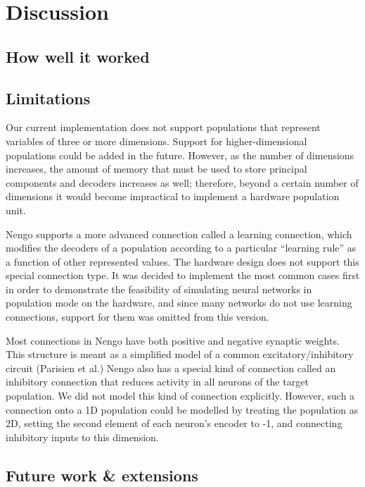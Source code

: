 \documentclass[english]{article}
\begin{document}
\section{Discussion}

\subsection{How well it worked}

\subsection{Limitations}

Our current implementation does not support populations that represent variables of three or more dimensions.
Support for higher-dimensional populations could be added in the future.
However, as the number of dimensions increases, the
amount of memory that must be used to store principal components and
decoders increases as well; therefore, beyond a certain number of
dimensions it would become impractical to implement a hardware
population unit.  

Nengo supports a more advanced connection called a learning connection,
which modifies the decoders of a population according to a particular ``learning rule''
as a function of other represented values. The hardware design does not support this special connection type.
It was decided to implement the most common cases first in order to demonstrate the feasibility of simulating
neural networks in population mode on the hardware, and since many networks do not use learning connections,
support for them was omitted from this version.

Most connections in Nengo have both positive and negative synaptic weights. This
structure is meant as a simplified model of a common excitatory/inhibitory circuit
(Parisien et al.) %
Nengo also has a special kind of connection called an inhibitory connection that
reduces activity in all neurons of the target population. We did not model this kind of connection explicitly.
However, such a connection onto a 1D population could be modelled by treating the population as 2D,
setting the second element of each neuron's encoder to -1, and connecting inhibitory inputs to this dimension.


\subsection{Future work \& extensions}
\end{document}
